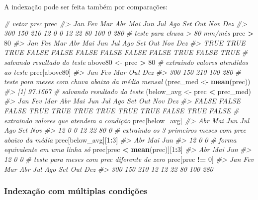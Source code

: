 \documentclass[]{book}
\newenvironment{Shaded}{\begin{snugshade}}{\end{snugshade}}
\newcommand{\KeywordTok}[1]{\textcolor[rgb]{0.13,0.29,0.53}{\textbf{#1}}}
\newcommand{\DecValTok}[1]{\textcolor[rgb]{0.00,0.00,0.81}{#1}}
\newcommand{\StringTok}[1]{\textcolor[rgb]{0.31,0.60,0.02}{#1}}
\newcommand{\CommentTok}[1]{\textcolor[rgb]{0.56,0.35,0.01}{\textit{#1}}}
\newcommand{\OperatorTok}[1]{\textcolor[rgb]{0.81,0.36,0.00}{\textbf{#1}}}
\newcommand{\NormalTok}[1]{#1}
\begin{document}
A indexação pode ser feita também por comparações:

\begin{Shaded}
\begin{Highlighting}[]
\CommentTok{# vetor prec}
\NormalTok{prec}
\CommentTok{#> Jan Fev Mar Abr Mai Jun Jul Ago Set Out Nov Dez }
\CommentTok{#> 300 150 210  12   0   0  12  22  80 100   0 280}
\CommentTok{# teste para chuva > 80 mm/mês}
\NormalTok{prec }\OperatorTok{>}\StringTok{ }\DecValTok{80}
\CommentTok{#>   Jan   Fev   Mar   Abr   Mai   Jun   Jul   Ago   Set   Out   Nov   Dez }
\CommentTok{#>  TRUE  TRUE  TRUE FALSE FALSE FALSE FALSE FALSE FALSE  TRUE FALSE  TRUE}
\CommentTok{# salvando resultado do teste}
\NormalTok{above80 <-}\StringTok{ }\NormalTok{prec }\OperatorTok{>}\StringTok{ }\DecValTok{80}
\CommentTok{# extraindo valores atendidos ao teste}
\NormalTok{prec[above80]}
\CommentTok{#> Jan Fev Mar Out Dez }
\CommentTok{#> 300 150 210 100 280}
\CommentTok{# teste para meses com chuva abaixo da média mensal}
\NormalTok{(prec_med <-}\StringTok{ }\KeywordTok{mean}\NormalTok{(prec))}
\CommentTok{#> [1] 97.1667}
\CommentTok{# salvando resultado do teste}
\NormalTok{(below_avg <-}\StringTok{ }\NormalTok{prec }\OperatorTok{<}\StringTok{ }\NormalTok{prec_med)}
\CommentTok{#>   Jan   Fev   Mar   Abr   Mai   Jun   Jul   Ago   Set   Out   Nov   Dez }
\CommentTok{#> FALSE FALSE FALSE  TRUE  TRUE  TRUE  TRUE  TRUE  TRUE FALSE  TRUE FALSE}
\CommentTok{# extraindo valores que atendem a condição}
\NormalTok{prec[below_avg]}
\CommentTok{#> Abr Mai Jun Jul Ago Set Nov }
\CommentTok{#>  12   0   0  12  22  80   0}
\CommentTok{# extraindo os 3 primeiros meses com prec abaixo da média}
\NormalTok{prec[below_avg][}\DecValTok{1}\OperatorTok{:}\DecValTok{3}\NormalTok{]}
\CommentTok{#> Abr Mai Jun }
\CommentTok{#>  12   0   0}
\CommentTok{# forma equivalente em uma linha só}
\NormalTok{prec[prec }\OperatorTok{<}\StringTok{ }\KeywordTok{mean}\NormalTok{(prec)][}\DecValTok{1}\OperatorTok{:}\DecValTok{3}\NormalTok{]}
\CommentTok{#> Abr Mai Jun }
\CommentTok{#>  12   0   0}
\CommentTok{# teste para meses com prec diferente de zero}
\NormalTok{prec[prec }\OperatorTok{!=}\StringTok{ }\DecValTok{0}\NormalTok{]}
\CommentTok{#> Jan Fev Mar Abr Jul Ago Set Out Dez }
\CommentTok{#> 300 150 210  12  12  22  80 100 280}
\end{Highlighting}
\end{Shaded}

\subsubsection{Indexação com múltiplas
condições}\label{indexacao-com-multiplas-condicoes}
\end{document}

